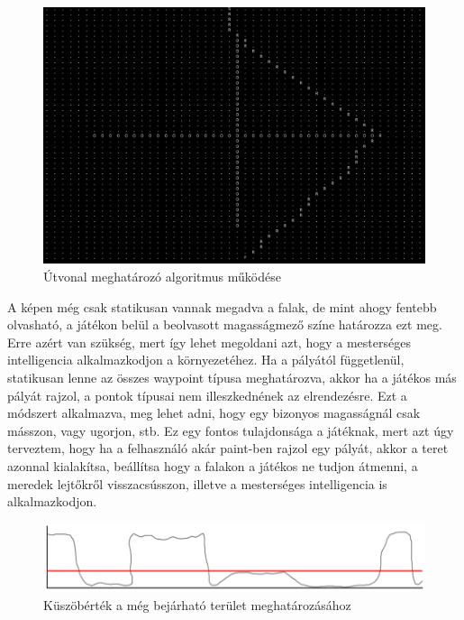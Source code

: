 \begin{figure}[h]
\centering
\includegraphics[scale=0.15]{kepek/mi_printscreen.png}
\caption{Útvonal meghatározó algoritmus működése}
\label{fig:mi_printscreen}
\end{figure}


A képen még csak statikusan vannak megadva a falak, de mint ahogy fentebb olvasható, a játékon belül a beolvasott magasságmező színe határozza ezt meg. Erre azért van szükség, mert így lehet megoldani azt, hogy a mesterséges intelligencia alkalmazkodjon a környezetéhez. Ha a pályától függetlenül, statikusan lenne az összes waypoint típusa meghatározva, akkor ha a játékos más pályát rajzol, a pontok típusai nem illeszkednének az elrendezésre. Ezt a módszert alkalmazva, meg lehet adni, hogy egy bizonyos magasságnál csak másszon, vagy ugorjon, stb. Ez egy fontos tulajdonsága a játéknak, mert azt úgy terveztem, hogy ha a felhasználó akár paint-ben rajzol egy pályát, akkor a teret azonnal kialakítsa, beállítsa hogy a falakon a játékos ne tudjon átmenni, a meredek lejtőkről visszacsússzon, illetve a mesterséges intelligencia is alkalmazkodjon.

\begin{figure}[h]
\centering
\includegraphics[scale=0.48]{kepek/magassagmezo_kuszobertek_diagram.png}
\caption{Küszöbérték a még bejárható terület meghatározásához}
\label{fig:kuszobertek}
\end{figure}

